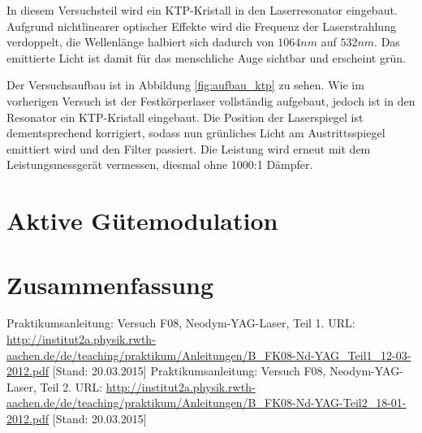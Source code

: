 \documentclass{../Misc/MontavonLaTeX/Montavon}
\begin{document}
In diesem Versuchsteil wird ein KTP-Kristall in den Laserresonator eingebaut. Aufgrund nichtlinearer optischer Effekte wird die Frequenz der Laserstrahlung verdoppelt, die Wellenlänge halbiert sich dadurch von $1064 \unit{nm}$ auf $532 \unit{nm}$. Das emittierte Licht ist damit für das menschliche Auge sichtbar und erscheint grün.

Der Versuchsaufbau ist in Abbildung \ref{fig:aufbau_ktp} zu sehen. Wie im vorherigen Versuch ist der Festkörperlaser vollständig aufgebaut, jedoch ist in den Resonator ein KTP-Kristall eingebaut. Die Position der Laserspiegel ist dementsprechend korrigiert, sodass nun grünliches Licht am Austrittsspiegel emittiert wird und den Filter passiert. Die Leistung wird erneut mit dem Leistungsmessgerät vermessen, diesmal ohne 1000:1 Dämpfer.


\section{Aktive Gütemodulation}

\section{Zusammenfassung}

\newpage
\begin{thebibliography}{xxxx}
 Praktikumsanleitung:
Versuch F08, Neodym-YAG-Laser, Teil 1. URL: \url{http://institut2a.physik.rwth-aachen.de/de/teaching/praktikum/Anleitungen/B_FK08-Nd-YAG_Teil1_12-03-2012.pdf} [Stand: 20.03.2015]
 Praktikumsanleitung:
Versuch F08, Neodym-YAG-Laser, Teil 2. URL: \url{http://institut2a.physik.rwth-aachen.de/de/teaching/praktikum/Anleitungen/B_FK08-Nd-YAG-Teil2_18-01-2012.pdf} [Stand: 20.03.2015]
\end{thebibliography}
\end{document}
